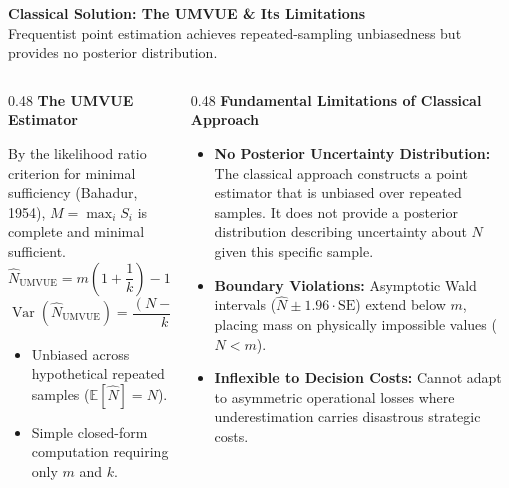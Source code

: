 \documentclass[aspectratio=169,10pt]{beamer}
\begin{document}
\begin{frame}[c]
  \begin{center}
    {\large \textbf{\color{headernavy} Classical Solution: The UMVUE \& Its Limitations}}\\[0.10cm]
    {\scriptsize \color{subgray} Frequentist point estimation achieves repeated-sampling unbiasedness but provides no posterior distribution.}
  \end{center}
  \vspace{0.38cm}
  
  \begin{columns}[t,onlytextwidth]
    \begin{column}{0.48\textwidth}
      {\small \textbf{\color{accentgreen} The UMVUE Estimator}}\\[0.08cm]
      {\scriptsize By the likelihood ratio criterion for minimal sufficiency (Bahadur, 1954), $M = \max_i S_i$ is complete and minimal sufficient.
      \begin{equation*}
        \widehat{N}_{\mathrm{UMVUE}} = m \left(1 + \frac{1}{k}\right) - 1
      \end{equation*}
      \begin{equation*}
        \operatorname{Var}(\widehat{N}_{\mathrm{UMVUE}}) = \frac{(N-k)(N+1)}{k(k+2)}
      \end{equation*}
      \begin{itemize}
        \setlength{\itemsep}{0.06cm}
        \item Unbiased across hypothetical repeated samples ($\mathbb{E}[\widehat{N}] = N$).
        \item Simple closed-form computation requiring only $m$ and $k$.
      \end{itemize}}
    \end{column}
    
    \begin{column}{0.48\textwidth}
      {\small \textbf{\color{accentred} Fundamental Limitations of Classical Approach}}\\[0.08cm]
      {\scriptsize
      \begin{itemize}
        \setlength{\itemsep}{0.10cm}
        \item \textbf{No Posterior Uncertainty Distribution:} The classical approach constructs a point estimator that is unbiased over repeated samples. It does not provide a posterior distribution describing uncertainty about $N$ given this specific sample.
        \item \textbf{Boundary Violations:} Asymptotic Wald intervals ($\widehat{N} \pm 1.96 \cdot \mathrm{SE}$) extend below $m$, placing mass on physically impossible values ($N < m$).
        \item \textbf{Inflexible to Decision Costs:} Cannot adapt to asymmetric operational losses where underestimation carries disastrous strategic costs.
      \end{itemize}}
    \end{column}
  \end{columns}
  

\end{frame}
\end{document}
